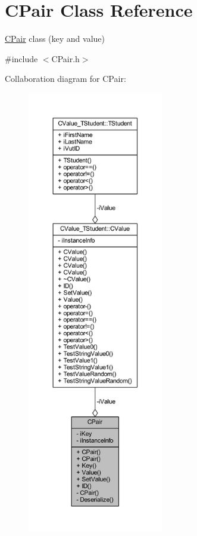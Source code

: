 \hypertarget{class_c_pair}{}\section{C\+Pair Class Reference}
\label{class_c_pair}


\hyperlink{class_c_pair}{C\+Pair} class (key and value)  




{\ttfamily \#include $<$C\+Pair.\+h$>$}



Collaboration diagram for C\+Pair\+:\nopagebreak
\begin{figure}[H]
\begin{center}
\leavevmode
\includegraphics[height=550pt]{class_c_pair__coll__graph}
\end{center}
\end{figure}
